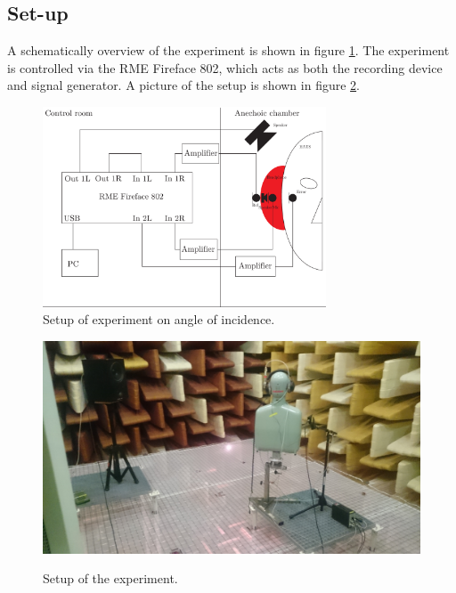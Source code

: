 \subsection{Set-up}

A schematically overview of the experiment is shown in figure \ref{Fig:AngleOfIncidenceSetup}. The experiment is controlled via the RME Fireface 802, which acts as both the recording device and signal generator. A picture of the setup is shown in figure \ref{AngIncidenceSetup}.

\begin{figure}[H]
	\centering
	\includegraphics[width=0.75\textwidth]{../Journal/Experiments/AngleOfIncidence/AngleOfIncidenceSetup.pdf}
	\caption{Setup of experiment on angle of incidence.}
	\label{Fig:AngleOfIncidenceSetup}
\end{figure}

\begin{figure}[H]
	\includegraphics[width=\textwidth]{../Journal/Experiments/AngleOfIncidence/AngInSetup.jpg}
	\label{AngIncidenceSetup}	
	\caption{Setup of the experiment.}
\end{figure}

